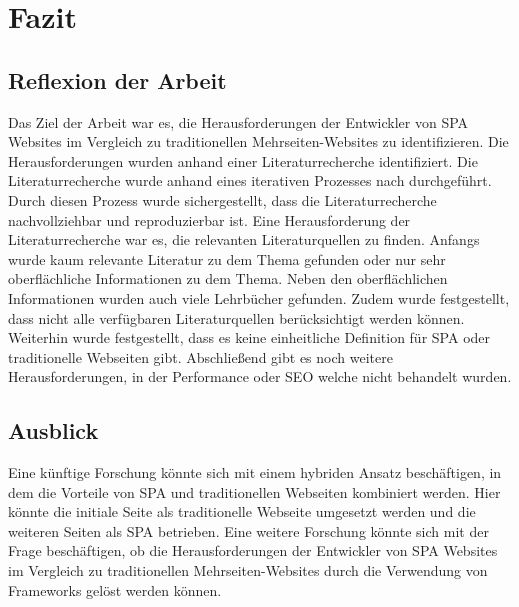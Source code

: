 \section{Fazit}

\subsection{Reflexion der Arbeit}
Das Ziel der Arbeit war es, die Herausforderungen der Entwickler von \ac{SPA} Websites im Vergleich zu traditionellen Mehrseiten-Websites zu identifizieren.
Die Herausforderungen wurden anhand einer Literaturrecherche identifiziert.
Die Literaturrecherche wurde anhand eines iterativen Prozesses nach  durchgeführt.
Durch diesen Prozess wurde sichergestellt, dass die Literaturrecherche nachvollziehbar und reproduzierbar ist.
Eine Herausforderung der Literaturrecherche war es, die relevanten Literaturquellen zu finden.
Anfangs wurde kaum relevante Literatur zu dem Thema gefunden oder nur sehr oberflächliche Informationen zu dem Thema.
Neben den oberflächlichen Informationen wurden auch viele Lehrbücher gefunden.
Zudem wurde festgestellt, dass nicht alle verfügbaren Literaturquellen berücksichtigt werden können.
Weiterhin wurde festgestellt, dass es keine einheitliche Definition für \ac{SPA} oder traditionelle Webseiten gibt.
Abschließend gibt es noch weitere Herausforderungen, in der Performance oder \ac{SEO} welche nicht behandelt wurden.

\subsection{Ausblick}
Eine künftige Forschung könnte sich mit einem hybriden Ansatz beschäftigen, in dem die Vorteile von \ac{SPA} und traditionellen Webseiten kombiniert werden.
Hier könnte die initiale Seite als traditionelle Webseite umgesetzt werden und die weiteren Seiten als \ac{SPA} betrieben.
Eine weitere Forschung könnte sich mit der Frage beschäftigen,
ob die Herausforderungen der Entwickler von \ac{SPA} Websites im Vergleich zu traditionellen Mehrseiten-Websites durch die Verwendung von Frameworks gelöst werden können.

